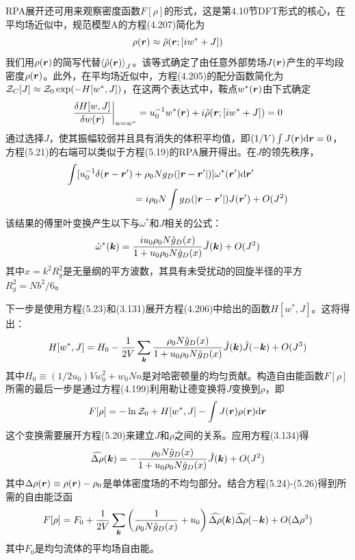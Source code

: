 RPA展开还可用来观察密度函数$F[\rho]$的形式，这是第4.10节DFT形式的核心，在平均场近似中，规范模型A的方程(4.207)简化为
\begin{equation}
\rho(\bm{r})\approx\tilde{\rho}(\bm{r};[iw^*+J])
\end{equation}
我们用$\rho(\bm{r})$的简写代替$\left\langle\hat{\rho}(\bm{r})\right\rangle_J$。该等式确定了由任意外部势场$J(\bm{r})$产生的平均段密度$\rho(\bm{r})$。此外，在平均场近似中，方程(4.205)的配分函数简化为$\mathcal{Z}_C[J]\approx\mathcal{Z}_0\exp(-H[w^*,J])$，在这两个表达式中，鞍点$w^*(\bm{r})$由下式确定
\begin{equation}
\frac{\delta H[w,J]}{\delta w(\bm{r})}\bigg|_{w=w^*}=u_0^{-1}w^*(\bm{r})+i\tilde{\rho}(\bm{r};[iw^*+J])=0
\end{equation}
通过选择$J$，使其振幅较弱并且具有消失的体积平均值，即$(1/V)\int J(\bm{r})\mathrm{d}\bm{r}=0$，方程(5.21)的右端可以类似于方程(5.19)的RPA展开得出。在$J$的领先秩序，
\begin{equation}
\begin{aligned}
\int[u_0^{-1}\delta(\bm{r}-\bm{r}')&+\rho_0Ng_D(\left|\bm{r}-\bm{r}'\right|)]\omega^*(\bm{r}')\mathrm{d}\bm{r}'\\
&=i\rho_0N\int g_D(\left|\bm{r}-\bm{r}'\right|)J(\bm{r}')+O(J^2)
\end{aligned}
\end{equation}
该结果的傅里叶变换产生以下与$\omega^*$和$J$相关的公式：
\begin{equation}
\hat{\omega}^*(\bm{k})=\frac{iu_0\rho_0N\hat{g}_D(x)}{1+u_0\rho_0N\hat{g}_D(x)}\hat{J}(\bm{k})+O(J^2)
\end{equation}
其中$x=k^2R_g^2$是无量纲的平方波数，其具有未受扰动的回旋半径的平方$R_g^2=Nb^2/6$。

下一步是使用方程(5.23)和(3.131)展开方程(4.206)中给出的函数$H[w^*,J]$。这将得出：
\begin{equation}
H[w^*,J]=H_0-\frac{1}{2V}\sum\limits_{\bm{k}}\frac{\rho_0N\hat{g}_D(x)}{1+u_0\rho_0N\hat{g}_D(x)}\hat{J}(\bm{k})\hat{J}(-\bm{k})+O(J^3)
\end{equation}
其中$H_0\equiv(1/2u_0)Vw_0^2+w_0Nn$是对哈密顿量的均匀贡献。构造自由能函数$F[\rho]$所需的最后一步是通过方程(4.199)利用勒让德变换将$J$变换到$\rho$，即
\begin{equation}
F[\rho]=-\ln\mathcal{Z}_0+H[w^*,J]-\int J(\bm{r})\rho(\bm{r})\mathrm{d}\bm{r}
\end{equation}
这个变换需要展开方程(5.20)来建立$J$和$\rho$之间的关系。应用方程(3.134)得
\begin{equation}
\widehat{\Delta\rho}(\bm{k})=-\frac{\rho_0N\hat{g}_D(x)}{1+u_0\rho_0N\hat{g}_D(x)}\hat{J}(\bm{k})+O(J^2)
\end{equation}
其中$\Delta\rho(\bm{r})\equiv\rho(\bm{r})-\rho_0$是单体密度场的不均匀部分。结合方程(5.24)-(5.26)得到所需的自由能泛函
\begin{equation}
F[\rho]=F_0+\frac{1}{2V}\sum\limits_{\bm{k}}\left(\frac{1}{\rho_0N\hat{g}_D(x)}+u_0\right)\widehat{\Delta\rho}(\bm{k})\widehat{\Delta\rho}(-\bm{k})+O(\Delta\rho^3)
\end{equation}
其中$F_0$是均匀流体的平均场自由能。


